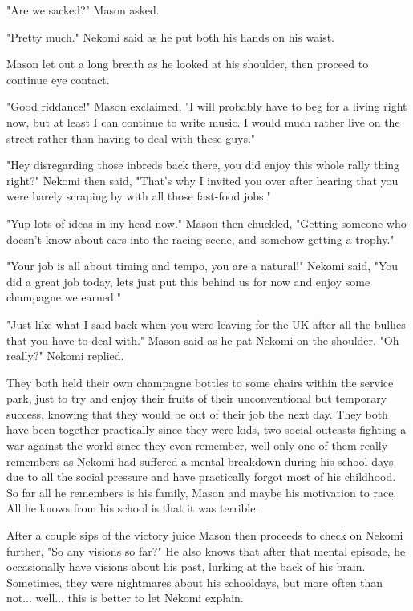 "Are we sacked?" Mason asked. 

"Pretty much." Nekomi said as he put both his hands on his waist. 

Mason let out a long breath as he looked at his shoulder, then proceed to continue eye contact. 

"Good riddance!" Mason exclaimed, "I will probably have to beg for a living right now, but at least I can continue to write music. I would much rather live on the street rather than having to deal with these guys."

"Hey disregarding those inbreds back there, you did enjoy this whole rally thing right?" Nekomi then said, "That's why I invited you over after hearing that you were barely scraping by with all those fast-food jobs."

"Yup lots of ideas in my head now." Mason then chuckled, "Getting someone who doesn't know about cars into the racing scene, and somehow getting a trophy."

"Your job is all about timing and tempo, you are a natural!" Nekomi said, "You did a great job today, lets just put this behind us for now and enjoy some champagne we earned."

"Just like what I said back when you were leaving for the UK after all the bullies that you have to deal with." Mason said as he pat Nekomi on the shoulder. "Oh really?" Nekomi replied. 

They both held their own champagne bottles to some chairs within the service park, just to try and enjoy their fruits of their unconventional but temporary success, knowing that they would be out of their job the next day. They both have been together practically since they were kids, two social outcasts fighting a war against the world since they even remember, well only one of them really remembers as Nekomi had suffered a mental breakdown during his school days due to all the social pressure and have practically forgot most of his childhood. So far all he remembers is his family, Mason and maybe his motivation to race. All he knows from his school is that it was terrible. 

After a couple sips of the victory juice Mason then proceeds to check on Nekomi further, "So any visions so far?" He also knows that after that mental episode, he occasionally have visions about his past, lurking at the back of his brain. Sometimes, they were nightmares about his schooldays, but more often than not... well... this is better to let Nekomi explain. 

